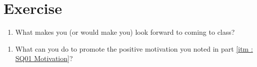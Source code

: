 %
%
%
%

\section{Exercise}

\begin{enumerate}[label=(\alph*)]
\item\label{itm : SQ01 Motivation} What makes you (or would make you) look forward to coming to class?
\end{enumerate}

\vspace{1.5in}

\begin{enumerate}[resume,label=(\alph*)]
\item What can you do to promote the positive motivation you noted in part \ref{itm : SQ01 Motivation}?
\end{enumerate}